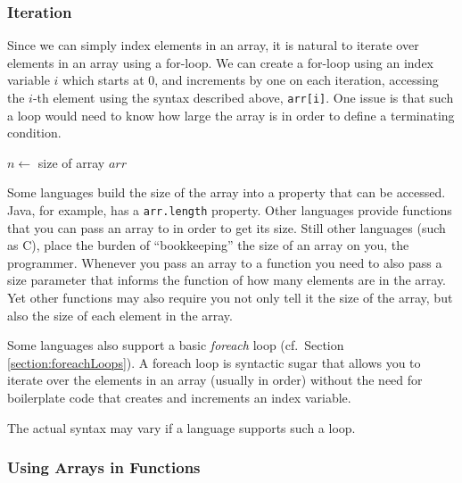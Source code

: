 \subsubsection{Iteration}

Since we can simply index elements in an array, it is natural to
iterate over elements in an array using a for-loop.  We can create
a for-loop using an index variable $i$ which starts at 0, and increments
by one on each iteration, accessing the $i$-th element using the
syntax described above, \texttt{arr[i]}.  One issue is that
such a loop would need to know how large the array is in order
to define a terminating condition.  

\begin{algorithm}
$n \leftarrow$ size of array $arr$ \;
\end{algorithm}

Some languages build the size of the array into a property that 
can be accessed.  Java, for example, has a \texttt{arr.length} 
property.  Other languages provide functions that you can pass an
array to in order to get its size.  Still other languages (such as C), 
place the burden of ``bookkeeping'' the size of an array on you, the
programmer.  Whenever you pass an array to a function you need
to also pass a size parameter that informs the function of how many
elements are in the array.  Yet other functions may also require you
not only tell it the size of the array, but also the size of each element
in the array.


Some languages also support a basic \emph{foreach} loop (cf.\ 
Section \ref{section:foreachLoops}).  A foreach loop is 
\gls{syntactic sugar} that allows you to iterate over the elements 
in an array (usually in order) without the need for boilerplate code 
that creates and increments an index variable.

\begin{algorithm}
\end{algorithm}

The actual syntax may vary if a language supports such a loop.

\subsubsection{Using Arrays in Functions}

